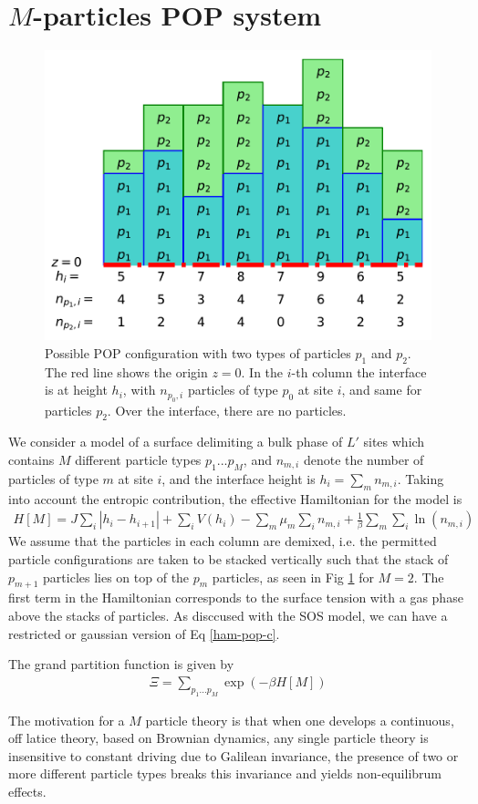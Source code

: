     \section{$M$-particles POP system}


\begin{figure}
    \centering
    \includegraphics[width=0.7\linewidth]{pop/figure-pop.pdf}
    \caption{Possible POP configuration with two types of particles $p_1$ and $p_2$. The red line shows the origin $z=0$. In the $i$-th column the interface is at height $h_i$, with $n_{p_0,i}$ particles of type $p_0$ at site $i$, and same for particles $p_2$. Over the interface, there are no particles. }
    \label{fig-pop}
\end{figure}

We consider a model of a surface delimiting a bulk phase of $L'$  sites which contains $M$ different particle types $p_1 ... p_M$, and $n_{m,i}$ denote the number of particles of type $m$ at site $i$, and the interface height is $h_i = \sum_m n_{m,i}$. Taking into account the entropic contribution, the effective Hamiltonian for the model is
\begin{align}
    H[M] = J \sum_i |h_i-h_{i+1}| + \sum_i V(h_i) - \sum_m \mu_m \sum_i n_{m,i} + \frac{1}{\beta} \sum_m \sum_i \ln(n_{m,i})
    \label{ham-pop-c}
\end{align}
We assume that the particles in each column are demixed, i.e. the permitted particle configurations are taken to be stacked vertically such that the stack of $p_{m+1}$ particles lies on top  of the $p_m$ particles, as seen in Fig \ref{fig-pop} for $M=2$. The first term in the Hamiltonian corresponds to the surface tension with a gas phase above the stacks of particles. As disccused with the SOS model, we can have a restricted or gaussian version of Eq \ref{ham-pop-c}. 

The grand partition function is given by
\begin{align}
    \Xi = \sum_{p_1...p_M} \exp(-\beta H[M])
\end{align}

The motivation for a $M$ particle theory is that when one develops a continuous, off latice theory, based on Brownian dynamics, any single particle theory is insensitive to constant driving due to Galilean invariance, the presence of two or more different particle types breaks this invariance and yields non-equilibrum effects.
